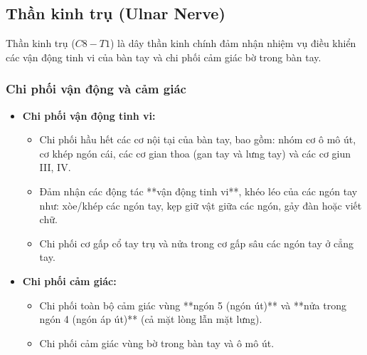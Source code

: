 \subsection{Thần kinh trụ (Ulnar Nerve)}

Thần kinh trụ ($C8 - T1$) là dây thần kinh chính đảm nhận nhiệm vụ điều khiển các vận động tinh vi của bàn tay và chi phối cảm giác bờ trong bàn tay.

\subsubsection{Chi phối vận động và cảm giác}
\begin{itemize}
    \item \textbf{Chi phối vận động tinh vi:}
    \begin{itemize}
        \item Chi phối hầu hết các cơ nội tại của bàn tay, bao gồm: nhóm cơ ô mô út, cơ khép ngón cái, các cơ gian thoa (gan tay và lưng tay) và các cơ giun III, IV.
        \item Đảm nhận các động tác **vận động tinh vi**, khéo léo của các ngón tay như: xòe/khép các ngón tay, kẹp giữ vật giữa các ngón, gảy đàn hoặc viết chữ.
        \item Chi phối cơ gấp cổ tay trụ và nửa trong cơ gấp sâu các ngón tay ở cẳng tay.
    \end{itemize}

    \item \textbf{Chi phối cảm giác:}
    \begin{itemize}
        \item Chi phối toàn bộ cảm giác vùng **ngón 5 (ngón út)** và **nửa trong ngón 4 (ngón áp út)** (cả mặt lòng lẫn mặt lưng).
        \item Chi phối cảm giác vùng bờ trong bàn tay và ô mô út.
    \end{itemize}
\end{itemize}

